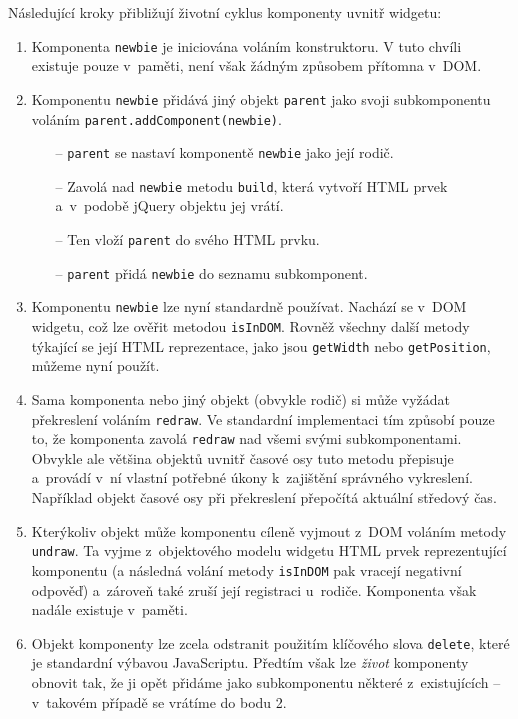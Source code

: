 				Následující kroky přibližují životní cyklus komponenty uvnitř widgetu:
				\begin{enumerate}
					\item Komponenta {\tt newbie} je iniciována voláním konstruktoru. V tuto chvíli existuje pouze v~paměti, není však žádným způsobem přítomna v~DOM.
					\item Komponentu {\tt newbie} přidává jiný objekt {\tt parent} jako svoji subkomponentu voláním {\tt parent.addComponent(newbie)}. 
					\begin{itemize}
						\item[--] {\tt parent} se nastaví komponentě {\tt newbie} jako její rodič.
						\item[--] Zavolá nad {\tt newbie} metodu {\tt build}, která vytvoří HTML prvek a~v~podobě jQuery objektu jej vrátí.
						\item[--] Ten vloží {\tt parent} do svého HTML prvku.
						\item[--] {\tt parent} přidá {\tt newbie} do seznamu subkomponent.
					\end{itemize}
					\item Komponentu {\tt newbie} lze nyní standardně používat. Nachází se v~DOM wid\-getu, což lze ověřit metodou {\tt isInDOM}. Rovněž všechny další metody týkající se její HTML reprezentace, jako jsou {\tt getWidth} nebo {\tt getPosition}, můžeme nyní použít.
					\item Sama komponenta nebo jiný objekt (obvykle rodič) si může vyžádat pře\-kreslení voláním {\tt redraw}. Ve standardní implementaci tím způsobí pouze to, že komponenta zavolá {\tt redraw} nad všemi svými subkomponentami. Obvykle ale většina objektů uvnitř časové osy tuto metodu přepisuje a~provádí v~ní vlastní potřebné úkony k~zajištění správného vykreslení. Například objekt časové osy při překreslení přepočítá aktuální středový čas.
					\item Kterýkoliv objekt může komponentu cíleně vyjmout z~DOM voláním metody {\tt undraw}. Ta vyjme z~objektového modelu widgetu HTML prvek reprezentující komponentu (a následná volání metody {\tt isInDOM} pak vracejí negativní odpověď) a~zároveň také zruší její registraci u~rodiče. Komponenta však nadále existuje v~paměti.
					\item Objekt komponenty lze zcela odstranit použitím klíčového slova {\tt delete}, které je standardní výbavou JavaScriptu. Předtím však lze \emph{život} komponenty obnovit tak, že ji opět přidáme jako subkomponentu některé z~existujících --  v~takovém případě se vrátíme do bodu 2.
				\end{enumerate}
			
